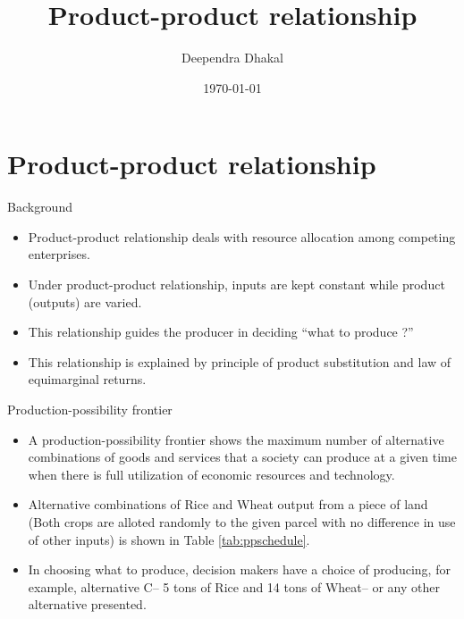 \documentclass[12pt,ignorenonframetext,aspectratio=169]{beamer}
\title{\insertsectionhead}
  {
    \definecolor{white}{rgb}{0.776,0.357,0.157}
    \definecolor{iqss@orange}{rgb}{1,1,1}
    \ifnum \insertmainframenumber > \insertframenumber
    \frame{
      \frametitle{\iqsssectiontitleheader}
      \tableofcontents[currentsection]
    }
    \else
    \frame{
      \frametitle{Backup Slides}
      \tableofcontents[sectionstyle=shaded/shaded,subsectionstyle=shaded/shaded/shaded]
    }
    \fi
  }
\title[]{Product-product relationship}
\author[
        Deependra Dhakal
    ]{Deependra Dhakal}
\institute[
    ]{
    GAASC, Baitadi \and Tribhuwan University
    }
\date[
      \today
  ]{
      \today
        }
\providecommand{\tightlist}{%
  \setlength{\itemsep}{0pt}\setlength{\parskip}{0pt}}
\begin{document}
  \begin{frame}[plain]
  \titlepage
  \end{frame}



\hypertarget{product-product-relationship}{%
\section{Product-product
relationship}\label{product-product-relationship}}

\begin{frame}{Background}
\protect\hypertarget{background}{}
\begin{itemize}
\tightlist
\item
  Product-product relationship deals with resource allocation among
  competing enterprises.
\item
  Under product-product relationship, inputs are kept constant while
  product (outputs) are varied.
\item
  This relationship guides the producer in deciding ``what to produce
  ?''
\item
  This relationship is explained by principle of product substitution
  and law of equimarginal returns.
\end{itemize}
\end{frame}

\begin{frame}{Production-possibility frontier}
\protect\hypertarget{production-possibility-frontier}{}
\begin{itemize}
\tightlist
\item
  A production-possibility frontier shows the maximum number of
  alternative combinations of goods and services that a society can
  produce at a given time when there is full utilization of economic
  resources and technology.
\item
  Alternative combinations of Rice and Wheat output from a piece of land
  (Both crops are alloted randomly to the given parcel with no
  difference in use of other inputs) is shown in Table
  \ref{tab:ppschedule}.
\item
  In choosing what to produce, decision makers have a choice of
  producing, for example, alternative C-- 5 tons of Rice and 14 tons of
  Wheat-- or any other alternative presented.
\end{itemize}
\end{frame}
\end{document}
